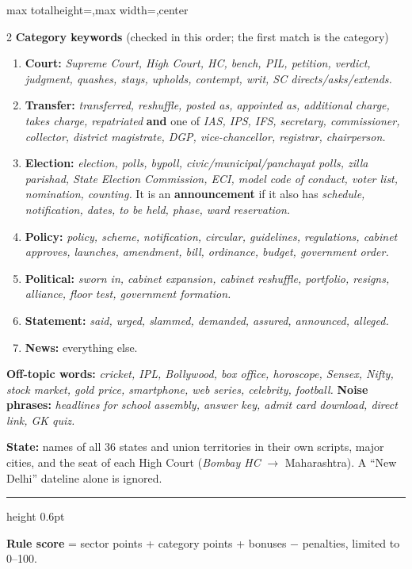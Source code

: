 \documentclass[8pt,a4paper]{extarticle}
\newcommand{\stage}[2]{\vspace{5pt}{\large\bfseries{\color{accent}Stage #1}\quad #2}\par\nobreak\vspace{1pt}%
  {\color{accent}\hrule height 0.6pt}\nobreak\vspace{3pt}}
\newcommand{\kw}[1]{\textit{#1}}
\newcommand{\lbl}[1]{\textbf{#1}}
\begin{document}
\begin{adjustbox}{max totalheight=\textheight,max width=\textwidth,center}
\begin{minipage}{\textwidth}
\begin{multicols}{2}
\vspace{2pt}
\lbl{Category keywords} (checked in this order; the first match is the category)
\begin{enumerate}
  \item \lbl{Court:} \kw{Supreme Court, High Court, HC, bench, PIL, petition, verdict, judgment, quashes, stays,
        upholds, contempt, writ, SC directs/asks/extends.}
  \item \lbl{Transfer:} \kw{transferred, reshuffle, posted as, appointed as, additional charge, takes charge,
        repatriated} \lbl{and} one of \kw{IAS, IPS, IFS, secretary, commissioner, collector, district magistrate,
        DGP, vice-chancellor, registrar, chairperson.}
  \item \lbl{Election:} \kw{election, polls, bypoll, civic/municipal/panchayat polls, zilla parishad, State
        Election Commission, ECI, model code of conduct, voter list, nomination, counting.}
        It is an \lbl{announcement} if it also has \kw{schedule, notification, dates, to be held, phase, ward reservation.}
  \item \lbl{Policy:} \kw{policy, scheme, notification, circular, guidelines, regulations, cabinet approves,
        launches, amendment, bill, ordinance, budget, government order.}
  \item \lbl{Political:} \kw{sworn in, cabinet expansion, cabinet reshuffle, portfolio, resigns, alliance, floor
        test, government formation.}
  \item \lbl{Statement:} \kw{said, urged, slammed, demanded, assured, announced, alleged.}
  \item \lbl{News:} everything else.
\end{enumerate}

\vspace{2pt}
\lbl{Off-topic words:} \kw{cricket, IPL, Bollywood, box office, horoscope, Sensex, Nifty, stock market, gold price,
smartphone, web series, celebrity, football.}
\lbl{Noise phrases:} \kw{headlines for school assembly, answer key, admit card download, direct link, GK quiz.}

\lbl{State:} names of all 36 states and union territories in their own scripts, major cities, and the seat of
each High Court (\kw{Bombay HC} $\rightarrow$ Maharashtra). A ``New Delhi'' dateline alone is ignored.

\stage{3}{Scoring (0 to 100)}
\lbl{Rule score} = sector points + category points + bonuses $-$ penalties, limited to 0--100.


\end{multicols}
\end{minipage}
\end{adjustbox}
\end{document}
